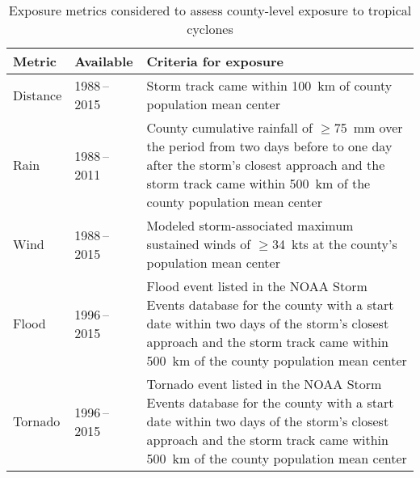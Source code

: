 \begin{table}%
\centering 
\caption{Exposure metrics considered to assess county-level exposure to 
tropical cyclones}
\begin{tabular}{p{1.5cm}p{2.5cm}p{10cm}} 
\toprule
Metric & Available & Criteria for exposure \\ \midrule 
Distance & 1988\,--\,2015 & Storm track came within 100~\si{\kilo\metre} of county population mean center\\ 
Rain & 1988\,--\,2011 & County cumulative rainfall of $\ge$75~\si{\milli\metre} over the period from two days before to 
one day after the storm's closest approach and the storm track came within 500~\si{\kilo\metre} of the county population mean center\\ 
Wind & 1988\,--\,2015 & Modeled storm-associated maximum sustained winds of $\ge$34~kts 
at the county's population mean center\\ 
Flood & 1996\,--\,2015 & Flood event listed in the \ac{NOAA} Storm Events database for the county with a start date within two days of the storm's closest approach and the storm track came within 500~\si{\kilo\metre} of the county population mean center \\
Tornado & 1996\,--\,2015 & Tornado event listed in the \ac{NOAA} Storm Events database for the county with a start date within two days of the storm's closest approach and the storm track came within 500~\si{\kilo\metre} of the county population mean center\\
\bottomrule 
\end{tabular} 
\label{tab:exposuremetrics} 
\end{table}

\clearpage


